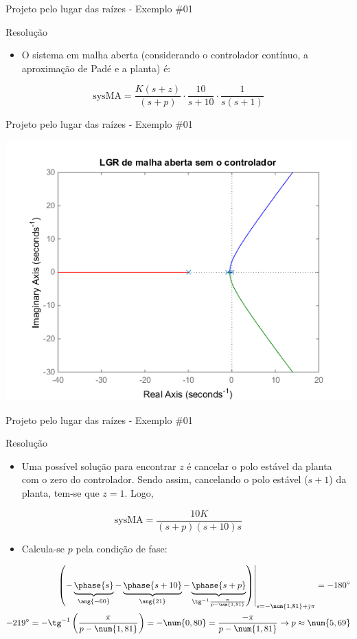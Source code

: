 \begin{frame}{Projeto pelo lugar das raízes - Exemplo \#01}
\begin{block}{Resolução}
\begin{itemize}
    \item O sistema em malha aberta (considerando o controlador contínuo, a aproximação de Padé e a planta) é:
\end{itemize}
	\[\text{sysMA}=\dfrac{K(s+z)}{(s+p)}\cdot\dfrac{10}{s+10}\cdot\dfrac{1}{s(s+1)} \]
\end{block}
\end{frame}

\begin{frame}{Projeto pelo lugar das raízes - Exemplo \#01}
\centerline{\includegraphics[width=0.8\linewidth]{Figuras/Ch10/fig1.png}}
\end{frame}


\begin{frame}{Projeto pelo lugar das raízes - Exemplo \#01}
\begin{block}{Resolução}
\begin{itemize}
    \item Uma possível solução para encontrar $z$ é cancelar o polo estável da planta com o zero do controlador. Sendo assim, cancelando o polo estável ($ s+1 $) da planta, tem-se que $ z=1 $. Logo,
\end{itemize}
	
	\[ \text{sysMA}=\frac{10K}{(s+p)(s+10)s} \]

\begin{itemize}
    \item Calcula-se $ p $ pela condição de fase:
\end{itemize}

	\begin{align*}
		\left. \left( -\underbrace{ \strut\phase{s}}_{\ang{-60}}-\underbrace{ \strut\phase{s+10}}_{\ang{21}}-\underbrace{ \strut\phase{s+p}}_{\tg^{-1}\frac{\pi}{p-\num{1,81}}}\right)\right| _{s=-\num{1,81}+j\pi}=-180^{\circ}\\
		-219^{\circ}=-\tg^{-1}\left(\dfrac{\pi}{p-\num{1,81}} \right)=-\num{0,80}=\dfrac{-\pi}{p-\num{1,81}}\rightarrow p\approx\num{5,69} 
	\end{align*}
\end{block}
\end{frame}


